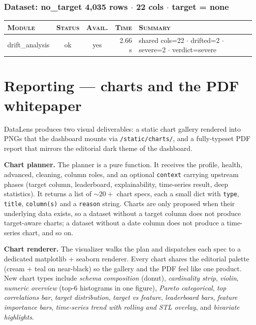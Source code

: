 \documentclass[11pt,a4paper]{article}
\begin{document}
\subsubsection*{Dataset: no\_target
\hfill {\color{ink3}\footnotesize 4,035 rows
{$\boldsymbol{\cdot}$} 22 cols
{$\boldsymbol{\cdot}$} target = none}}

\begin{tabularx}{\linewidth}{l c c r X}
\toprule
\textsc{Module} & \textsc{Status} & \textsc{Avail.} & \textsc{Time} & \textsc{Summary} \\
\midrule
drift\_analysis & \textcolor{ok}{ok} & \textcolor{ok}{yes} & 2.66 s & shared cols=22 $\cdot$ drifted=2 $\cdot$ severe=2 $\cdot$ verdict=severe \\
\bottomrule
\end{tabularx}


\section{Reporting --- charts and the PDF whitepaper}\label{sec:reporting}

DataLens produces two visual deliverables: a static chart gallery rendered into PNGs that the dashboard mounts via \texttt{/static/charts/}, and a fully-typeset PDF report that mirrors the editorial dark theme of the dashboard.

\textbf{Chart planner.} The planner is a pure function. It receives the profile, health, advanced, cleaning, column roles, and an optional \texttt{context} carrying upstream phases (target column, leaderboard, explainability, time-series result, deep statistics). It returns a list of $\sim 20+$ chart specs, each a small dict with \texttt{type}, \texttt{title}, \texttt{column(s)} and a \texttt{reason} string. Charts are only proposed when their underlying data exists, so a dataset without a target column does not produce target-aware charts; a dataset without a date column does not produce a time-series chart, and so on.

\textbf{Chart renderer.} The visualizer walks the plan and dispatches each spec to a dedicated matplotlib + seaborn renderer. Every chart shares the editorial palette (cream + teal on near-black) so the gallery and the PDF feel like one product. New chart types include \emph{schema composition} (donut), \emph{cardinality strip}, \emph{violin}, \emph{numeric overview} (top-6 histograms in one figure), \emph{Pareto categorical}, \emph{top correlations bar}, \emph{target distribution}, \emph{target vs feature}, \emph{leaderboard bars}, \emph{feature importance bars}, \emph{time-series trend with rolling and STL overlay}, and \emph{bivariate highlights}.
\end{document}
